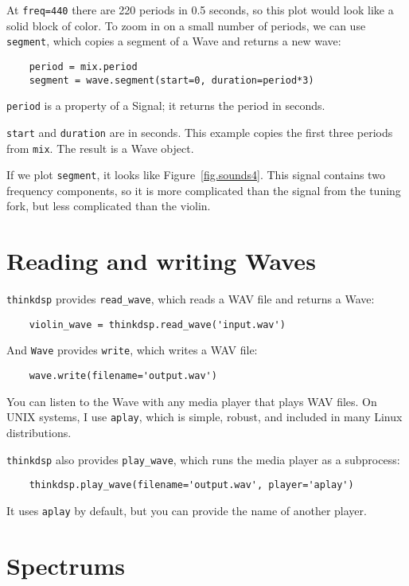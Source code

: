At {\tt freq=440} there are 220 periods in 0.5 seconds, so this plot
would look like a solid block of color.  To zoom in on a small number
of periods, we can use {\tt segment}, which copies a segment of a Wave
and returns a new wave:

\begin{verbatim}
	period = mix.period
	segment = wave.segment(start=0, duration=period*3)
\end{verbatim}

{\tt period} is a property of a Signal; it returns the period in seconds.

{\tt start} and {\tt duration} are in seconds.  This example copies
the first three periods from {\tt mix}.  The result is a Wave object.

If we plot {\tt segment}, it looks like Figure~\ref{fig.sounds4}.
This signal contains two frequency components, so it is more
complicated than the signal from the tuning fork, but less complicated
than the violin.


\section{Reading and writing Waves}

{\tt thinkdsp} provides \verb"read_wave", which reads a WAV
file and returns a Wave:

\begin{verbatim}
	violin_wave = thinkdsp.read_wave('input.wav')
\end{verbatim}

And {\tt Wave} provides {\tt write}, which writes a WAV file:

\begin{verbatim}
	wave.write(filename='output.wav')
\end{verbatim}

You can listen to the Wave with any media player that plays WAV
files.  On UNIX systems, I use {\tt aplay}, which is simple, robust,
and included in many Linux distributions.

{\tt thinkdsp} also provides \verb"play_wave", which runs
the media player as a subprocess:

\begin{verbatim}
	thinkdsp.play_wave(filename='output.wav', player='aplay')
\end{verbatim}

It uses {\tt aplay} by default, but you can provide the
name of another player.


\section{Spectrums}
\label{spectrums}

